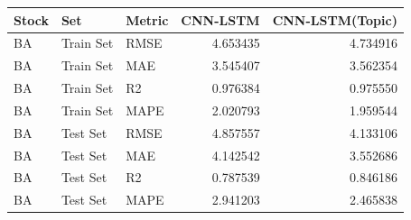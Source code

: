 \begin{tabular}{lllrr}
\toprule
Stock & Set & Metric & CNN-LSTM & CNN-LSTM(Topic) \\
\midrule
BA & Train Set & RMSE & 4.653435 & 4.734916 \\
BA & Train Set & MAE & 3.545407 & 3.562354 \\
BA & Train Set & R2 & 0.976384 & 0.975550 \\
BA & Train Set & MAPE & 2.020793 & 1.959544 \\
BA & Test Set & RMSE & 4.857557 & 4.133106 \\
BA & Test Set & MAE & 4.142542 & 3.552686 \\
BA & Test Set & R2 & 0.787539 & 0.846186 \\
BA & Test Set & MAPE & 2.941203 & 2.465838 \\
\bottomrule
\end{tabular}
